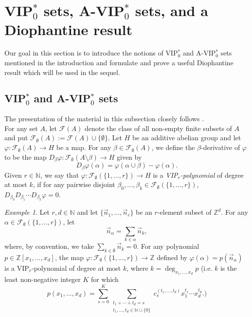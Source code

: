 \documentclass[11pt,american,preprint]{elsarticle}
\numberwithin{equation}{section}
\theoremstyle{plain}
\theoremstyle{plain*}
\theoremstyle{plain}
\theoremstyle{plain*}
\theoremstyle{plain}
\theoremstyle{plain*}
\theoremstyle{remark}
\theoremstyle{remark*}
\theoremstyle{remark}
\theoremstyle{remark*}
\theoremstyle{remark}
\newtheorem{example}[thm]{Example}
\theoremstyle{remark*}
\theoremstyle{plain}
\theoremstyle{definition}
\theoremstyle{plain}
\theoremstyle{plain} %
\newcommand{\N}{\mathbb{N}}
\newcommand{\Z}{\mathbb{Z}}
\begin{document}
\section{VIP$_0^*$ sets, A-VIP$_0^*$ sets, and a Diophantine result}\label{Sec:3}
Our goal in this section is to introduce the notions of VIP$_0^*$ and A-VIP$_0^*$ sets mentioned in the introduction and formulate and prove a useful Diophantine result which will be used in the sequel.
\subsection{{\rm VIP$_0^*$} and {\rm A-VIP$_0^*$} sets}\label{Sec3.1}
The presentation of the material in this subsection closely  follows  \cite[pp. 645-646]{BerLeibNilsystemsIPr}.\\
For any  set $A$, let $\mathcal F(A)$ denote the class of all non-empty finite subsets of $A$ and put $\mathcal F_\emptyset(A):=\mathcal F(A)\cup\{\emptyset\}$. Let $H$ be an additive abelian group and let   $\varphi:\mathcal F_\emptyset (A)\rightarrow H$ be a map. For any $\beta\in\mathcal F_\emptyset (A)$, we define the $\beta$-derivative of $\varphi$ to be the map $D_\beta\varphi:\mathcal F_\emptyset(A\setminus \beta)\rightarrow H$ given by 
$$D_\beta\varphi(\alpha)=\varphi(\alpha\cup \beta)-\varphi(\alpha).$$
Given $r\in\N$, we say that $\varphi:\mathcal F_\emptyset(\{1,...,r\})\rightarrow H$ is a \textit{VIP$_r$-polynomial} of degree at most $k$, if for any pairwise disjoint $\beta_0,...,\beta_k\in\mathcal F_\emptyset (\{1,...,r\})$, $D_{\beta_0}D_{\beta_1}\cdots D_{\beta_k}\varphi=0$.
\begin{example}
    Let $r,d\in\N$ and let $\{\vec n_1,...,\vec n_r\}$ be an $r$-element subset of $\Z^d$. For any $\alpha\in \mathcal F_\emptyset(\{1,...,r\})$, let 
    $$\vec n_\alpha=\sum_{k\in\alpha}\vec n_k,$$
    where, by convention, we take $\sum_{k\in\emptyset}\vec n_k=0$. For any polynomial $p\in \Z[x_1,...,x_d]$, the map $\varphi:\mathcal F_\emptyset(\{1,...,r\})\rightarrow \Z$ defined by $\varphi(\alpha)=p(\vec n_\alpha)$ is a VIP$_r$-polynomial of degree at most $k$, where $k=\deg_{x_1,...,x_d} p$ (i.e. $k$ is the least non-negative integer $K$ for which 
 $$
 p(x_1,...,x_d)=\sum_{s=0}^K\sum_{\substack{t_1+\cdots+t_d=s\\t_1,...,t_d\in\N\cup\{0\}}}c_s^{(t_1,...,t_d)}x_1^{t_1}\cdots  x_d^{t_d}.)$$
\end{example}
\end{document}
